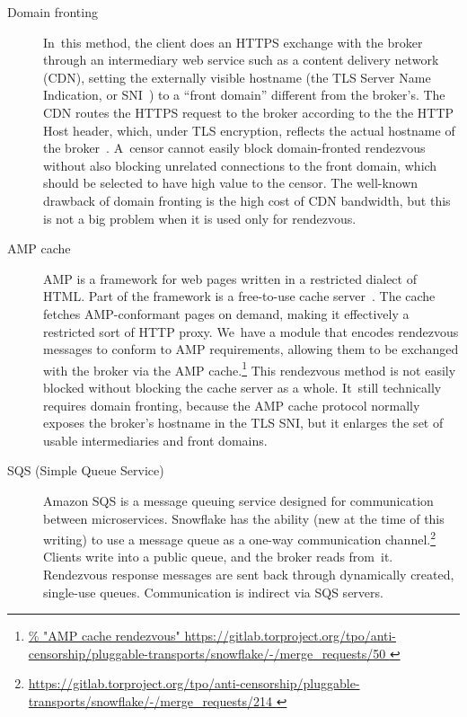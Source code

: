 \documentclass[letterpaper,twocolumn]{article}
\newlength{\urlfootnotesize}
\newcommand{\urlfootnote}[1]{\footnote{
\raggedright\hangindent\footnotemargin%
\fontsize{\urlfootnotesize}{\urlfootnotesize}\selectfont%
\url{#1}
}}
\begin{document}
\begin{description}
\item[Domain fronting]
In~this method, the client does an HTTPS exchange with the broker
through an intermediary web service such as a content delivery network (CDN),
setting the externally visible hostname
(the TLS Server Name Indication, or SNI~\cite[\S 3]{rfc6066})
to a ``front domain'' different from the broker's.
The CDN routes the HTTPS request to the broker according to the
the HTTP Host header, which, under TLS encryption,
reflects the actual hostname of the broker~\cite{Fifield2015a}.
A~censor cannot easily block domain-fronted rendezvous
without also blocking unrelated connections to the front domain,
which should be selected to have high value to the censor.
The well-known drawback of domain fronting
is the high cost of CDN bandwidth,
but this is not a big problem
when it is used only for rendezvous.

\item[AMP cache]
AMP is a framework for web pages written in a restricted dialect of HTML.
Part of the framework is a free-to-use
cache server~\cite{amp-cache}.
The cache fetches AMP-conformant pages on demand,
making it effectively a restricted sort of HTTP proxy.
We~have a module that encodes rendezvous messages to conform to AMP requirements,
allowing them to be exchanged with the broker via the AMP cache.\urlfootnote{
https://gitlab.torproject.org/tpo/anti-censorship/pluggable-transports/snowflake/-/merge_requests/50
}
This rendezvous method is not easily blocked
without blocking the cache server as a whole.
It~still technically requires domain fronting,
because the AMP cache protocol normally exposes the
broker's hostname in the TLS SNI,
but it enlarges the set of usable intermediaries and front domains.

\item[SQS (Simple Queue Service)]
Amazon SQS is a message queuing service designed for
communication between microservices.
Snowflake has the ability
(new at the time of this writing)
to use a message queue as a one-way communication channel.\urlfootnote{
https://gitlab.torproject.org/tpo/anti-censorship/pluggable-transports/snowflake/-/merge_requests/214
}
Clients write into a public queue, and the broker reads from~it.
Rendezvous response messages are sent back through
dynamically created, single-use queues.
Communication is indirect via SQS servers.
\end{description}
\end{document}
